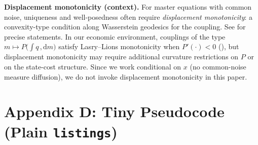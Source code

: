 ﻿\documentclass[11pt,letterpaper,oneside]{article}
\numberwithin{equation}{section}
\newcommand{\1}{\mathbf{1}}
\newcommand{\diff}{,\mathrm{d}}
\begin{document}
\begin{tcolorbox}[mathstyle]
\textbf{Displacement monotonicity (context).}
For master equations with common noise, uniqueness and well-posedness often require \emph{displacement monotonicity}: a convexity-type condition along Wasserstein geodesics for the coupling. See \cite{cardaliaguet_delarue_lasry_lions_2019} for precise statements. In our economic environment, couplings of the type $m\mapsto P\!\big(\int q\,\diff m\big)$ satisfy Lasry--Lions monotonicity when $P'(\cdot)<0$ (), but displacement monotonicity may require additional curvature restrictions on $P$ or on the state-cost structure. Since we work conditional on $x$ (no common-noise measure diffusion), we do not invoke displacement monotonicity in this paper.
\end{tcolorbox}

\section{Appendix D: Tiny Pseudocode (Plain \texorpdfstring{\texttt{listings}}{listings})}\label{app:code}

\lstset{
basicstyle=\ttfamily\small,
columns=fullflexible,
showstringspaces=false,
frame=single,
framerule=0.4pt,
breaklines=true,
tabsize=2,
captionpos=b
}
\end{document}
